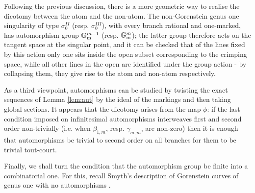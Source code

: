 \documentclass[11pt]{amsart}
\newcommand{\Gm}{\mathbb{G}_{\rm{m}}}
\theoremstyle{plain}
\theoremstyle{definition}
\begin{document}
Following the previous discussion, there is a more geometric way to realise the dicotomy between the atom and the non-atom. The non-Gorenstein genus one singularity of type $\sigma_0^{II}$ (resp. $\sigma_0^{III}$), with every branch rational and one-marked, has automorphism group $\Gm^{m-1}$ (resp. $\Gm^m$); the latter group therefore acts on the tangent space at the singular point, and it can be checked that of the lines fixed by this action only one sits inside the open subset corresponding to the crimping space, while all other lines in the open are identified under the group action - by collapsing them, they give rise to the atom and non-atom respectively.

As a third viewpoint, automorphisms can be studied by twisting the exact sequences of Lemma \ref{lem:aut} by the ideal of the markings and then taking global sections. It appears that the dicotomy arises from the map $\phi$: if the last condition imposed on infinitesimal automorphisms interweaves first and second order non-trivially (i.e. when $\beta_{1,m}$, resp. $\gamma_{m,m}$, are non-zero) then it is enough that automorphisms be trivial to second order on all branches for them to be trivial tout-court.

\smallskip

Finally, we shall turn the condition that the automorphism group be finite into a combinatorial one. For this, recall Smyth's description of Gorenstein curves of genus one with no automorphisms \cite[Proposition 2.3, Corollary 2.4]{SMY1}.
\end{document}
